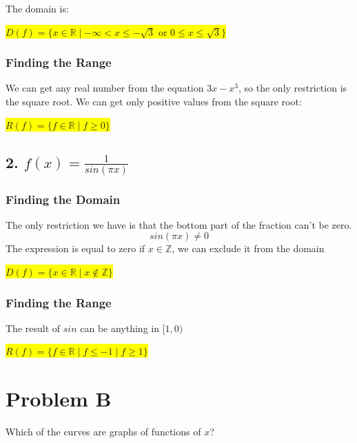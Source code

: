 \documentclass{article}
\begin{document}
The domain is:
\begin{center}
\colorbox{yellow}{$D(f) = \{ x \in \mathbb{R} \mid -\infty < x \leq -\sqrt{3} \text{ or } 0 \leq x \leq \sqrt{3} \}$}
\end{center}

\subsubsection*{Finding the Range}
We can get any real number from the equation \(3x - x^3\), so the only restriction is the square root. We can get only positive values from the square root:
\begin{center}
\colorbox{yellow}{$R(f) = \{ f \in \mathbb{R} \mid f \geq 0 \}$}
\end{center}

\subsection*{2. $f(x) = \frac{1}{sin(\pi x)} $}

\subsubsection*{Finding the Domain}
The only restriction we have is that the bottom part of the fraction can't be zero.
\[
sin(\pi x) \neq 0
\]
The expression is equal to zero if $x \in \mathbb{Z}$, we can exclude it from the domain

\begin{center}
\colorbox{yellow}{$D(f) = \{ x \in \mathbb{R} \mid x \notin \mathbb{Z} \}$}
\end{center}

\subsubsection*{Finding the Range}

The result of $sin$ can be anything in $[1, 0)$

\begin{center}
\colorbox{yellow}{$R(f) = \{ f \in \mathbb{R} \mid f \leq -1 \mid f \geq 1 \}$}
\end{center}

\newpage

\section*{Problem B}

Which of the curves are graphs of functions of $x$?
\end{document}
